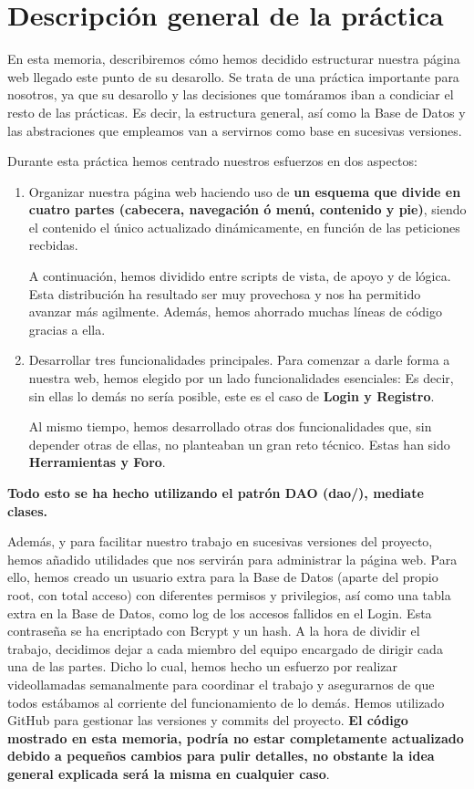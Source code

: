 \documentclass[12pt]{report}
\begin{document}
\section{Descripción general de la práctica}

En esta memoria, describiremos cómo hemos decidido estructurar nuestra página web llegado este punto de su desarollo.  Se trata de una práctica importante para nosotros, ya que su desarollo y las decisiones que tomáramos iban a condiciar el resto de las prácticas. Es decir, la estructura general, así como la Base de Datos y las abstraciones que empleamos van a servirnos como base en sucesivas versiones.

Durante esta práctica hemos centrado nuestros esfuerzos en dos aspectos:

\begin{enumerate}  
\item Organizar nuestra página web haciendo uso de \textbf{un esquema que divide en cuatro partes (cabecera, navegación ó menú, contenido y pie)}, siendo el contenido el único actualizado dinámicamente, en función de las peticiones recbidas. 

A continuación, hemos dividido entre scripts de vista, de apoyo y de lógica. Esta distribución ha resultado ser muy provechosa y nos ha permitido avanzar más agilmente. Además, hemos ahorrado muchas líneas de código gracias a ella.

\item Desarrollar tres funcionalidades principales. Para comenzar a darle forma a nuestra web, hemos elegido por un lado funcionalidades esenciales: Es decir, sin ellas lo demás no sería posible, este es el caso de \textbf{Login y Registro}. 

Al mismo tiempo, hemos desarrollado otras dos funcionalidades que, sin depender otras de ellas, no planteaban un gran reto técnico. Estas han sido \textbf{Herramientas y Foro}.

\end{enumerate}

\textbf{Todo esto se ha hecho utilizando el patrón DAO (dao/), mediate clases.}

Además, y para facilitar nuestro trabajo en sucesivas versiones del proyecto, hemos añadido utilidades que nos servirán para administrar la página web. Para ello, hemos creado un usuario extra para la Base de Datos (aparte del propio root, con total acceso) con diferentes permisos y privilegios, así como una tabla extra en la Base de Datos, como log de los accesos fallidos en el Login. Esta contraseña se ha encriptado con Bcrypt y un hash. A la hora de dividir el trabajo, decidimos dejar a cada miembro del equipo encargado de dirigir cada una de las partes. Dicho lo cual, hemos hecho un esfuerzo por realizar videollamadas semanalmente para coordinar el trabajo y asegurarnos de que todos estábamos al corriente del funcionamiento de lo demás. Hemos utilizado GitHub para gestionar las versiones y commits del proyecto. \textbf{El código mostrado en esta memoria, podría no estar completamente actualizado debido a pequeños cambios para pulir detalles, no obstante la idea general explicada será la misma en cualquier caso}.
\newpage
\end{document}
